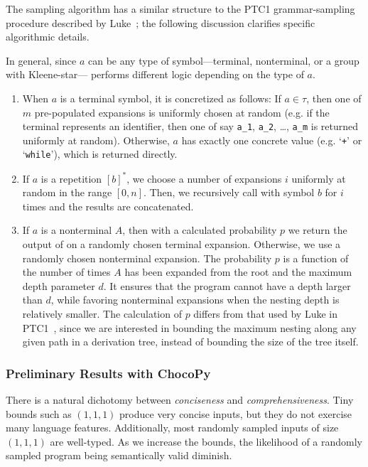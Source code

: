 \documentclass[conference]{IEEEtran}
\begin{document}
The sampling algorithm has a similar structure to the PTC1 grammar-sampling procedure described by Luke~\cite{Luke00}; the following discussion clarifies specific algorithmic details.

In general, since $a$ can be any type of symbol---terminal, nonterminal, or a group with Kleene-star---  performs different logic depending on the type of $a$. 
\begin{enumerate}
    \item When $a$ is a terminal symbol, it is concretized as follows: If $a \in \tau$, then one of $m$ pre-populated expansions is uniformly chosen at random (e.g. if the terminal represents an identifier, then one of say \texttt{a\_1}, \texttt{a\_2}, \dots, \texttt{a\_m} is returned uniformly at random). Otherwise, $a$ has exactly one concrete value (e.g. `\texttt{+}' or `\texttt{while}'), which is returned directly.
    \item If $a$ is a repetition $[b]^*$, we choose a number of expansions $i$ uniformly at random in the range $[0, n]$. Then, we recursively call  with symbol $b$ for $i$ times and the results are concatenated.
    \item If $a$ is a nonterminal $A$, then with a calculated probability $p$ we return the output of  on a randomly chosen terminal expansion. Otherwise, we use a randomly chosen nonterminal expansion.
The probability $p$ is a function of the number of times $A$ has been expanded from the root and the maximum depth parameter $d$.  It ensures that the program cannot have a depth larger than $d$, while favoring nonterminal expansions when the nesting depth is relatively smaller. The calculation of $p$ differs from that used by Luke in PTC1~\cite{Luke00}, since we are interested in bounding the maximum nesting along any given path in a derivation tree, instead of bounding the size of the tree itself.\end{enumerate}

\subsubsection*{Preliminary Results with ChocoPy} 

 There is a natural dichotomy between \emph{conciseness} and \emph{comprehensiveness}. Tiny bounds such as $(1, 1, 1)$ produce very concise inputs, but they do not exercise many language features. Additionally, most randomly sampled inputs of size $(1, 1, 1)$ are well-typed. As we increase the bounds, the likelihood of a randomly sampled program being semantically valid diminish.
\end{document}

